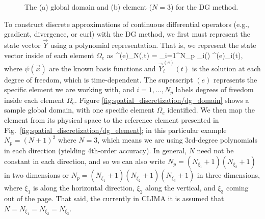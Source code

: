 \documentclass{article}
\begin{document}
\begin{figure}[htbp]
\begin{center}
\end{center}
\caption{The (a) global domain and (b) element ($N=3$) for the DG method.}
\label{fig:spatial_discretization/dg_method}
\end{figure}

To construct discrete approximations of continuous differential operators (e.g., gradient, divergence, or curl) with the DG method, we first must represent the state vector $\vec{Y}$ using a polynomial representation.  That is, we represent the state vector inside of each element $\Omega_e$ as
\be
{}^{(e)}_N(,t) = \sum_{i=1}^{N_p} \psi_i() ^{(e)}_i(t),
\label{eq:spatial_discretization/dg_method}
\ee
where $\psi(\vec{x})$ are the known basis functions and $\vec{Y}^{(e)}_i(t)$ is
the solution at each degree of freedom, which is time-dependent. The superscript
$(e)$ represents the specific element we are working with, and $i=1,\ldots,N_p$
labels degrees of freedom inside each element $\Omega_e$.  Figure
\ref{fig:spatial_discretization/dg_domain} shows a sample global domain, with
one specific element $\Omega_e$ identified.  We then map the element from its
physical space to the reference element presented in Fig.\
\ref{fig:spatial_discretization/dg_element}; in this particular example
$N_p=(N+1)^2$ where $N=3$, which means we are using 3rd-degree polynomials in
each direction (yielding 4th-order accuracy).  In general, $N$ need not be
constant in each direction, and so we can also write
$N_p=(N_{\xi_{1}}+1)(N_{\xi_{2}}+1)$ in two dimensions or
$N_p=(N_{\xi_{1}}+1)(N_{\xi_{2}}+1)(N_{\xi_{3}}+1)$ in three dimensions, where
$\xi_{1}$ is along the horizontal direction, $\xi_{2}$ along the vertical, and
$\xi_{3}$ coming out of the page. That said, the currently in CLIMA it is
assumed that $N = N_{\xi_{1}} = N_{\xi_{2}} = N_{\xi_{3}}$.
\end{document}

